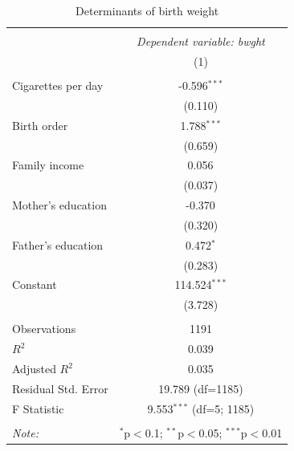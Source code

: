 \begin{table}[!htbp] \centering
  \caption{Determinants of birth weight}
  \label{tab:bwght}
\begin{tabular}{@{\extracolsep{5pt}}lc}
\\[-1.8ex]\hline
\hline \\[-1.8ex]
& \multicolumn{1}{c}{\textit{Dependent variable: bwght}} \
\cr \cline{2-2}
\\[-1.8ex] & (1) \\
\hline \\[-1.8ex]
 Cigarettes per day & -0.596$^{***}$ \\
& (0.110) \\
 Birth order & 1.788$^{***}$ \\
& (0.659) \\
 Family income & 0.056$^{}$ \\
& (0.037) \\
 Mother's education & -0.370$^{}$ \\
& (0.320) \\
 Father's education & 0.472$^{*}$ \\
& (0.283) \\
 Constant & 114.524$^{***}$ \\
& (3.728) \\
\hline \\[-1.8ex]
 Observations & 1191 \\
 $R^2$ & 0.039 \\
 Adjusted $R^2$ & 0.035 \\
 Residual Std. Error & 19.789 (df=1185) \\
 F Statistic & 9.553$^{***}$ (df=5; 1185) \\
\hline
\hline \\[-1.8ex]
\textit{Note:} & \multicolumn{1}{r}{$^{*}$p$<$0.1; $^{**}$p$<$0.05; $^{***}$p$<$0.01} \\
\end{tabular}
\end{table}